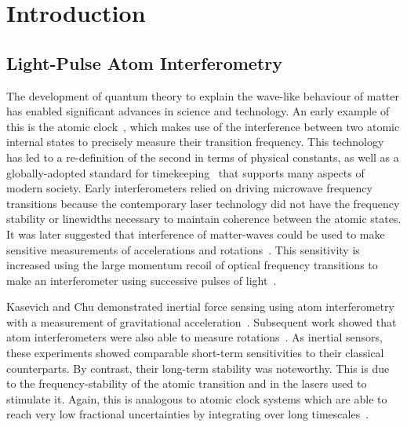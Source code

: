 \chapter{Introduction}\label{chap:intro}
\section{Light-Pulse Atom Interferometry}
The development of quantum theory to explain the wave-like behaviour
of matter has enabled significant advances in science and technology.
An early example of this is the atomic clock~\cite{ESSEN1955}, which makes use of the
interference between two atomic internal states to precisely measure
their transition frequency. This technology has led to a
re-definition of the second in terms of physical constants, as well as
a globally-adopted standard for timekeeping~\cite{Levine} that supports many aspects
of modern society. Early interferometers relied on driving microwave
frequency transitions because the contemporary laser technology did
not have the frequency stability or linewidths necessary to maintain coherence
between the atomic states. It was later
suggested that interference of matter-waves could be used to make
sensitive measurements of accelerations and
rotations~\cite{Clauser1988}. This sensitivity is increased using the large momentum
recoil of optical frequency transitions to make an interferometer
using successive pulses of light~\cite{Borde1989}.\par\noindent
Kasevich and Chu demonstrated inertial force sensing using atom
interferometry with a measurement of gravitational acceleration~\cite{Kasevich1991,Kasevich1992}. 
Subsequent work showed that atom interferometers were also able to
measure rotations~\cite{Durfee2006,Dubetsky2006}. As inertial sensors, these
experiments showed comparable short-term sensitivities to their
classical counterparts. By contrast, their long-term stability was
noteworthy. This is due to the frequency-stability of the atomic
transition and in the lasers used to stimulate it. Again, this is
analogous to atomic clock systems which are able to reach very low
fractional uncertainties by integrating over long
timescales~\cite{Borde2002}. 
